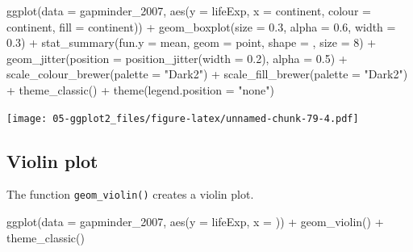 \documentclass[
]{book}
\newenvironment{Shaded}{\begin{snugshade}}{\end{snugshade}}
\newcommand{\AttributeTok}[1]{\textcolor[rgb]{0.77,0.63,0.00}{#1}}
\newcommand{\DecValTok}[1]{\textcolor[rgb]{0.00,0.00,0.81}{#1}}
\newcommand{\FloatTok}[1]{\textcolor[rgb]{0.00,0.00,0.81}{#1}}
\newcommand{\FunctionTok}[1]{\textcolor[rgb]{0.00,0.00,0.00}{#1}}
\newcommand{\NormalTok}[1]{#1}
\newcommand{\SpecialCharTok}[1]{\textcolor[rgb]{0.00,0.00,0.00}{#1}}
\newcommand{\StringTok}[1]{\textcolor[rgb]{0.31,0.60,0.02}{#1}}
\begin{document}
\begin{Shaded}
\begin{Highlighting}[]


\FunctionTok{ggplot}\NormalTok{(}\AttributeTok{data =}\NormalTok{ gapminder\_2007, }
       \FunctionTok{aes}\NormalTok{(}\AttributeTok{y =}\NormalTok{ lifeExp, }\AttributeTok{x =}\NormalTok{ continent, }\AttributeTok{colour =}\NormalTok{ continent, }\AttributeTok{fill =}\NormalTok{ continent)) }\SpecialCharTok{+} 
   \FunctionTok{geom\_boxplot}\NormalTok{(}\AttributeTok{size =} \FloatTok{0.3}\NormalTok{, }\AttributeTok{alpha =} \FloatTok{0.6}\NormalTok{, }\AttributeTok{width =} \FloatTok{0.3}\NormalTok{) }\SpecialCharTok{+}
   \FunctionTok{stat\_summary}\NormalTok{(}\AttributeTok{fun.y =}\NormalTok{ mean, }\AttributeTok{geom =} \StringTok{\textquotesingle{}point\textquotesingle{}}\NormalTok{, }\AttributeTok{shape =} \StringTok{\textquotesingle{}{-}\textquotesingle{}}\NormalTok{, }\AttributeTok{size =} \DecValTok{8}\NormalTok{) }\SpecialCharTok{+}
   \FunctionTok{geom\_jitter}\NormalTok{(}\AttributeTok{position =} \FunctionTok{position\_jitter}\NormalTok{(}\AttributeTok{width =} \FloatTok{0.2}\NormalTok{), }\AttributeTok{alpha =} \FloatTok{0.5}\NormalTok{) }\SpecialCharTok{+}
   \FunctionTok{scale\_colour\_brewer}\NormalTok{(}\AttributeTok{palette =} \StringTok{"Dark2"}\NormalTok{) }\SpecialCharTok{+}
   \FunctionTok{scale\_fill\_brewer}\NormalTok{(}\AttributeTok{palette =} \StringTok{"Dark2"}\NormalTok{) }\SpecialCharTok{+}
   \FunctionTok{theme\_classic}\NormalTok{() }\SpecialCharTok{+}
   \FunctionTok{theme}\NormalTok{(}\AttributeTok{legend.position =} \StringTok{"none"}\NormalTok{)}
\end{Highlighting}
\end{Shaded}

\texttt{[image: 05-ggplot2\_files/figure-latex/unnamed-chunk-79-4.pdf]}

\hypertarget{violin-plot}{%
\subsection{Violin plot}\label{violin-plot}}

The function \texttt{geom\_violin()} creates a violin plot.

\begin{Shaded}
\begin{Highlighting}[]
\FunctionTok{ggplot}\NormalTok{(}\AttributeTok{data =}\NormalTok{ gapminder\_2007, }\FunctionTok{aes}\NormalTok{(}\AttributeTok{y =}\NormalTok{ lifeExp, }\AttributeTok{x =} \StringTok{\textquotesingle{}\textquotesingle{}}\NormalTok{)) }\SpecialCharTok{+} 
   \FunctionTok{geom\_violin}\NormalTok{() }\SpecialCharTok{+}
   \FunctionTok{theme\_classic}\NormalTok{()}
\end{Highlighting}
\end{Shaded}
\end{document}
